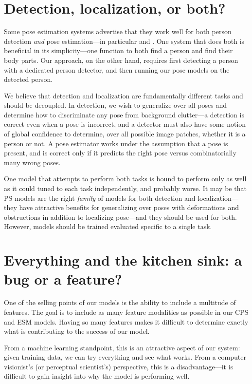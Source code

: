 \section{Detection, localization, or both?}

Some pose estimation systems advertise that they work well for both person 
detection {\em and} pose estimation---in particular \citet{andriluka09} and 
\citet{deva2011}.  One system that does both is beneficial in its 
simplicity---one function to both find a person and find their body parts.  Our 
approach, on the other hand, requires first detecting a person with a dedicated 
person detector, and then running our pose models on the detected person. 

We believe that detection and localization are fundamentally different tasks 
and should be decoupled.  In detection, we wish to generalize over all poses 
and determine how to discriminate any pose from background clutter---a 
detection is correct even when a pose is incorrect, and a detector must also 
have some notion of global confidence to determine, over all possible image 
patches, whether it is a person or not.  A pose estimator works under the 
assumption that a pose is present, and is correct only if it predicts the right 
pose versus combinatorially many wrong poses.

One model that attempts to perform both tasks is bound to perform only as well 
as it could tuned to each task independently, and probably worse.  It may be 
that PS models are the right {\em family} of models for both detection and 
localization---they have attractive benefits for generalizing over poses with 
deformations and obstructions in addition to localizing pose---and they should 
be used for both.  However, models should be trained evaluated specific to a 
single task.

\section{Everything and the kitchen sink: a bug or a feature?}
One of the selling points of our models is the ability to include a multitude 
of features.  The goal is to include as many feature modalities as possible in 
our CPS and ESM models.  Having so many features makes it difficult to 
determine exactly what is contributing to the success of our model.  

From a machine learning standpoint, this is an attractive aspect of our system: 
given training data, we can try everything and see what works.  From a computer 
visionist's (or perceptual scientist's) perspective, this is a 
disadvantage---it is difficult to gain insight into why the model is performing 
well.

